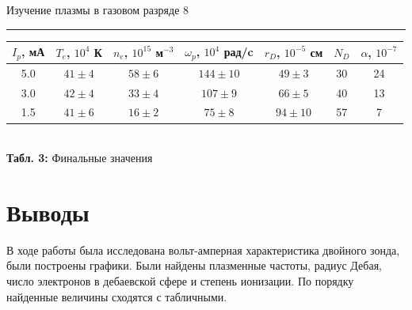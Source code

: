 \documentclass[12pt,a4paper]{scrartcl}
\begin{document}
\newpage


	\begin{flushleft}
		\footnotesize{Изучение плазмы в газовом разряде} \hspace{\fill} \footnotesize{8}
		\\[-0.3cm]\noindent\rule{\textwidth}{0.3pt}
	\end{flushleft}	

\begin{table}[h!]
\centering
\begin{tabular}{|c|c|c|c|c|c|c|}
\hline
$I_p$, мА  & $T_e$, $10^4$ К   & $n_e$, $10^{15}$ м$^{-3}$ & $\omega_p$, $10^4$ рад/c & $r_D$, $10^{-5}$ см & $N_D$ & $\alpha$, $10^{-7}$ \\ \hline
5.0   & $41\pm 4$ & $58\pm 6$                     & $144\pm 10$                   & $49\pm 3$                      & 30 & 24\\ \hline
3.0   & $42\pm 4$ & $33\pm 4$                     & $107\pm 9$                    & $66\pm 5$                      & 40 & 13\\ \hline
1.5   & $41\pm 6$ & $16\pm 2$                    & $75\pm 8$                     & $94 \pm 10$                     & 57 & 7\\ \hline
\end{tabular}
\\\textbf{Табл. 3:} Финальные значения
\end{table}

\section{Выводы}
В ходе работы была исследована вольт-амперная характеристика двойного зонда, были построены графики. Были найдены плазменные частоты, радиус Дебая, число электронов в дебаевской сфере и степень ионизации. По порядку найденные величины сходятся с табличными.
\end{document}
